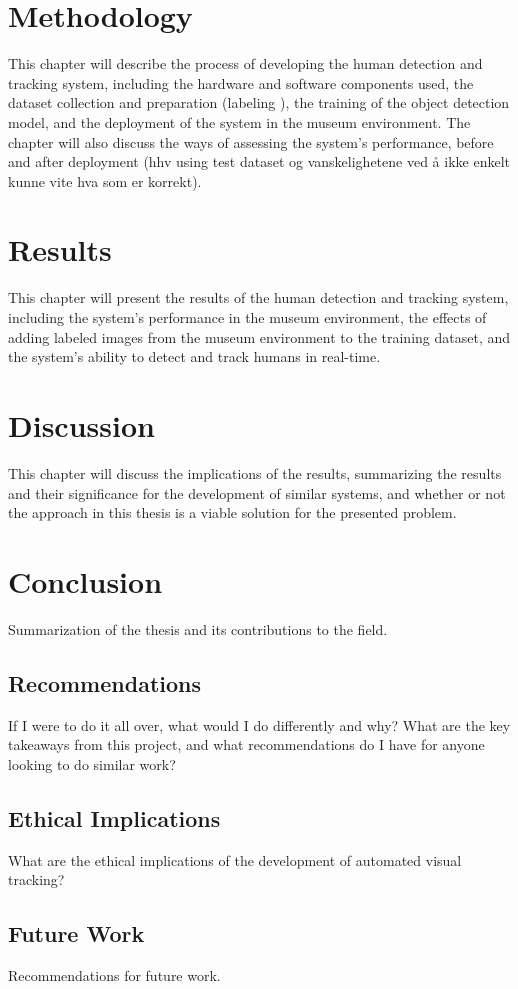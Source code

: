 \section{Methodology}
This chapter will describe the process of developing the human detection and tracking system, including the hardware and software components used, the dataset collection and preparation (labeling ), the training of the object detection model, and the deployment of the system in the museum environment. The chapter will also discuss the ways of assessing the system's performance, before and after deployment (hhv using test dataset og vanskelighetene ved å ikke enkelt kunne vite hva som er korrekt).

\section{Results}
This chapter will present the results of the human detection and tracking system, including the system's performance in the museum environment, the effects of adding labeled images from the museum environment to the training dataset, and the system's ability to detect and track humans in real-time.

\section{Discussion}
This chapter will discuss the implications of the results, summarizing the results and their significance for the development of similar systems, and whether or not the approach in this thesis is a viable solution for the presented problem. 

\section{Conclusion}
Summarization of the thesis and its contributions to the field.

\subsection{Recommendations}
If I were to do it all over, what would I do differently and why? What are the key takeaways from this project, and what recommendations do I have for anyone looking to do similar work?

\subsection{Ethical Implications}
What are the ethical implications of the development of automated visual tracking?

\subsection{Future Work}
Recommendations for future work.